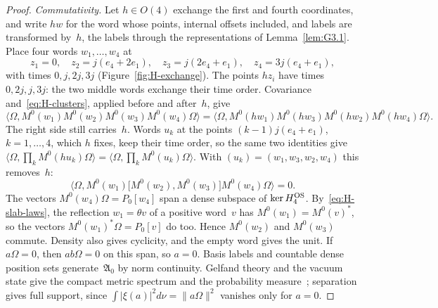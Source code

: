 \begin{proof}
\emph{Commutativity.} Let $h\in O(4)$ exchange the first and fourth coordinates, and write $hw$ for the word whose points, internal offsets included, and labels are transformed by~$h$, the labels through the representations of Lemma~\ref{lem:G3.1}. Place four words $w_1,\ldots,w_4$ at
\begin{equation*}
z_1=0,\quad z_2=j(e_4+2e_1),\quad z_3=j(2e_4+e_1),\quad z_4=3j(e_4+e_1),
\end{equation*}
with times $0,j,2j,3j$ (Figure~\ref{fig:H-exchange}). The points $hz_i$ have times $0,2j,j,3j$: the two middle words exchange their time order. Covariance and~\eqref{eq:H-clusters}, applied before and after~$h$, give
\begin{equation*}
\langle\Omega,M^0(w_1)M^0(w_2)M^0(w_3)M^0(w_4)\Omega\rangle
=\langle\Omega,M^0(hw_1)M^0(hw_3)M^0(hw_2)M^0(hw_4)\Omega\rangle .
\end{equation*}
The right side still carries~$h$. Words $u_k$ at the points $(k-1)j(e_4+e_1)$, $k=1,\ldots,4$, which $h$ fixes, keep their time order, so the same two identities give $\langle\Omega,\prod_kM^0(hu_k)\Omega\rangle=\langle\Omega,\prod_kM^0(u_k)\Omega\rangle$. With $(u_k)=(w_1,w_3,w_2,w_4)$ this removes~$h$:
\begin{equation*}
\langle\Omega,M^0(w_1)\bigl[M^0(w_2),M^0(w_3)\bigr]M^0(w_4)\Omega\rangle=0 .
\end{equation*}
The vectors $M^0(w_4)\Omega=P_0[w_4]$ span a dense subspace of $\ker H_4^{\rm OS}$. By~\eqref{eq:H-slab-laws}, the reflection $w_1=\theta v$ of a positive word~$v$ has $M^0(w_1)=M^0(v)^*$, so the vectors $M^0(w_1)^*\Omega=P_0[v]$ do too. Hence $M^0(w_2)$ and $M^0(w_3)$ commute. Density also gives cyclicity, and the empty word gives the unit. If $a\Omega=0$, then $ab\Omega=0$ on this span, so $a=0$. Basis labels and countable dense position sets generate~$\mathfrak A_0$ by norm continuity. Gelfand theory and the vacuum state give the compact metric spectrum and the probability measure~\cite[Theorems~2.4.1 and~2.8.2]{Landsman1998}; separation gives full support, since $\int|\xi(a)|^2d\nu=\|a\Omega\|^2$ vanishes only for $a=0$.
\end{proof}

